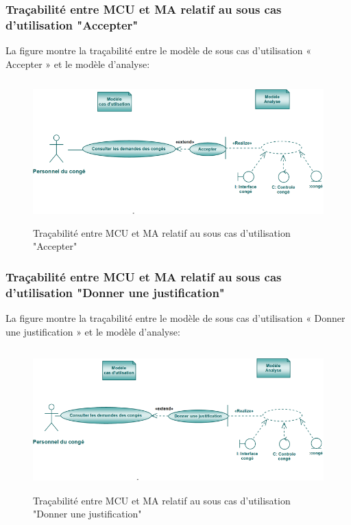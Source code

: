 \documentclass[12 pt]{report}
\begin{document}
\subsubsection{Traçabilité entre MCU et MA relatif au sous cas d’utilisation "Accepter" }
La figure  montre la traçabilité entre le modèle de sous cas d’utilisation « Accepter » et le modèle d’analyse:
\begin{figure}[h]
\begin{center}
\includegraphics[width= 12cm , height =5.5cm]{acc.PNG}
\caption{Traçabilité entre MCU et MA relatif au sous cas d’utilisation "Accepter"}
\end{center}
\end{figure}
\subsubsection{Traçabilité entre MCU et MA relatif au sous cas d’utilisation "Donner une justification" }
La figure  montre la traçabilité entre le modèle de sous cas d’utilisation « Donner une justification » et le modèle d’analyse:
\begin{figure}[h]
\begin{center}
\includegraphics[width= 12cm , height =5.5cm]{don.PNG}
\caption{Traçabilité entre MCU et MA relatif au sous cas d’utilisation "Donner une justification"}
\end{center}
\end{figure}
\end{document}
